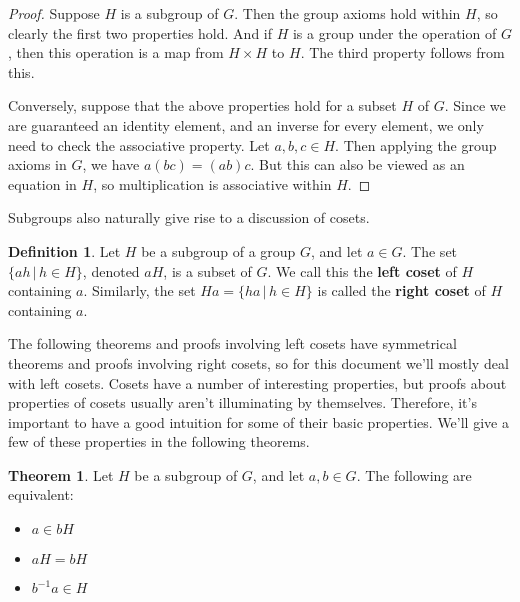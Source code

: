 \documentclass[12pt]{article}
\newcommand{\inv}[1]{#1^{-1}}
\theoremstyle{definition}
\newtheorem{definition}{Definition}[section]
\newtheorem{theorem}{Theorem}[section]
\newenvironment{thm}
{\theoremstyle{definition}
\begin{theorem}}
{\end{theorem}}
\newenvironment{defn}[1][]
{\theoremstyle{definition}
\begin{definition}{}}
{\end{definition}}
\begin{document}
\begin{proof}
Suppose $H$ is a subgroup of $G$. Then the group axioms hold within $H$, so clearly the first two properties hold. And if $H$ is a group under the operation of $G$, then this operation is a map from $H \times H$ to $H$. The third property follows from this.

Conversely, suppose that the above properties hold for a subset $H$ of $G$. Since we are guaranteed an identity element, and an inverse for every element, we only need to check the associative property. Let $a, b, c \in H$. Then applying the group axioms in $G$, we have $a(bc) = (ab)c$. But this can also be viewed as an equation in $H$, so multiplication is associative within $H$.

\end{proof}

Subgroups also naturally give rise to a discussion of cosets.

\begin{defn}
Let $H$ be a subgroup of a group $G$, and let $a \in G$. The set $\{ah \,|\, h \in H\}$, denoted $aH$, is a subset of $G$. We call this the \textbf{left coset} of $H$ containing $a$. Similarly, the set $Ha = \{ha \,|\, h \in H\}$ is called the \textbf{right coset} of $H$ containing $a$.
\end{defn}

The following theorems and proofs involving left cosets have symmetrical theorems and proofs involving right cosets, so for this document we'll mostly deal with left cosets. Cosets have a number of interesting properties, but proofs about properties of cosets usually aren't illuminating by themselves. Therefore, it's important to have a good intuition for some of their basic properties. We'll give a few of these properties in the following theorems.

\begin{thm}
Let $H$ be a subgroup of $G$, and let $a, b \in G$. The following are equivalent:
\begin{itemize}
\item $a \in bH$
\item $aH = bH$
\item $\inv{b}a \in H$
\end{itemize}
\end{thm}
\end{document}
